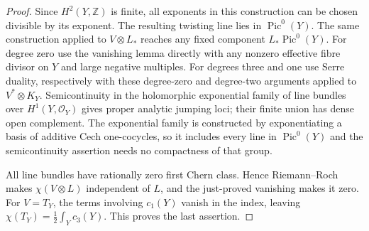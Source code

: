 \begin{proof}
Since $H^2(Y,\mathbb Z)$ is finite, all exponents in this construction
can be chosen divisible by its exponent. The resulting twisting line
lies in $\operatorname{Pic}^0(Y)$. The same construction applied to
$V\otimes L_*$ reaches any fixed component $L_*\operatorname{Pic}^0(Y)$.
For degree zero use the vanishing lemma directly with any nonzero
effective fibre divisor on $Y$ and large negative multiples.
For degrees three and one use Serre duality, respectively with these
degree-zero and degree-two arguments applied to $V^*\otimes K_Y$.
Semicontinuity in the holomorphic exponential family of line bundles
over $H^1(Y,\mathcal O_Y)$ gives proper analytic jumping loci; their
finite union has dense open complement. The exponential family is
constructed by exponentiating a basis of additive Cech one-cocycles,
so it includes every line in $\operatorname{Pic}^0(Y)$ and the
semicontinuity assertion needs no compactness of that group.

All line bundles have rationally zero first Chern class. Hence
Riemann--Roch makes $\chi(V\otimes L)$ independent of $L$, and the
just-proved vanishing makes it zero. For $V=T_Y$, the terms involving
$c_1(Y)$ vanish in the index, leaving
$\chi(T_Y)=\tfrac12\int_Yc_3(Y)$. This proves the last assertion.
\end{proof}



